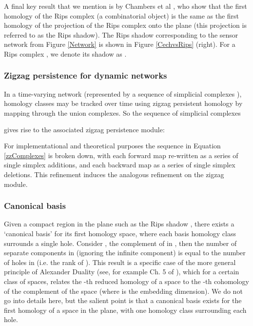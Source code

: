 \documentclass[12pt]{article}
\begin{document}
A final key result that we mention is by Chambers et al \cite{Chambers2010}, who show that the first homology of the Rips complex (a combinatorial object) is the same as the first homology of the projection of the Rips complex onto the plane (this projection is referred to as the Rips shadow). The Rips shadow corresponding to the sensor network from Figure \ref{Network} is shown in Figure \ref{CechvsRips} (right). For a Rips complex , we denote its shadow as .

\subsubsection{Zigzag persistence for dynamic networks}

In a time-varying network (represented by a sequence of simplicial complexes ), homology classes  may be tracked over time using zigzag persistent homology by mapping through the union complexes. So the sequence of simplicial complexes


gives rise to the associated zigzag persistence module:

\begin{footnotesize}

\end{footnotesize}

For implementational and theoretical purposes the sequence in Equation \ref{zzComplexes} is broken down, with each forward map re-written as a series of single simplex additions, and each backward map as a series of single simplex deletions. This refinement induces the analogous refinement on the zigzag module.


\subsubsection{Canonical basis}\label{Canonical}

Given a compact region in the plane such as the Rips shadow , there exists a `canonical basis' for its first homology space, where each basis homology class surrounds a single hole. Consider , the complement of  in , then the number of separate components in  (ignoring the infinite component) is equal to the number of holes in  (i.e. the rank of ). This result is a specific case of the more general principle of Alexander Duality (see, for example Ch. 5 of \cite{Miller2005}), which for a certain class of spaces, relates the -th reduced homology of a space to the -th cohomology of the complement of the space (where  is the embedding dimension). We do not go into details here, but the salient point is that a canonical basis exists for the first homology of a space in the plane, with one homology class surrounding each hole.
\end{document}
